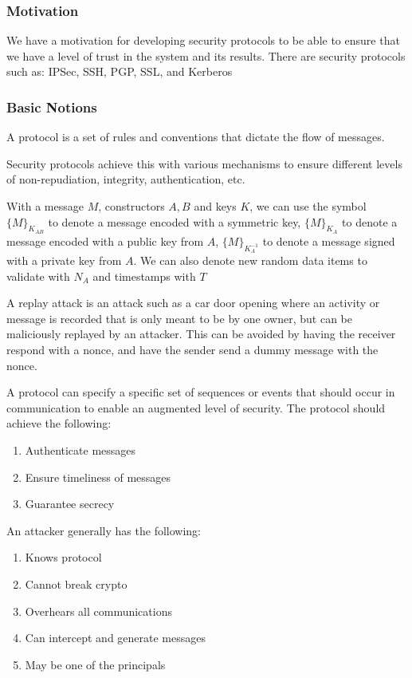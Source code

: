 \documentclass[11pt]{article}
\begin{document}
\subsubsection{Motivation}
We have a motivation for developing security protocols to be able to ensure that we have a level of trust in the system and its results.
There are security protocols such as: IPSec, SSH, PGP, SSL, and Kerberos

\subsubsection{Basic Notions}
A protocol is a set of rules and conventions that dictate the flow of messages.

Security protocols achieve this with various mechanisms to ensure different levels of non-repudiation, integrity, authentication, etc.

With a message $M$, constructors $A,B$ and keys $K$, we can use the symbol $\{ M \}_{K_{AB}}$ to denote a message encoded with a symmetric key,  $\{ M \}_{K_{A}}$ to denote a message encoded with a public key from $A$,  $\{ M \}_{K_{A}^{-1}}$ to denote a message signed with a private key from $A$.
We can also denote new random data items to validate with $N_A$ and timestamps with $T$

A replay attack is an attack such as a car door opening where an activity or message is recorded that is only meant to be by one owner, but can be maliciously replayed by an attacker.
This can be avoided by having the receiver respond with a nonce, and have the sender send a dummy message with the nonce.

A protocol can specify a specific set of sequences or events that should occur in communication to enable an augmented level of security.
The protocol should achieve the following:
\begin{enumerate}
    \item Authenticate messages
    \item Ensure timeliness of messages
    \item Guarantee secrecy
\end{enumerate}

An attacker generally has the following:
\begin{enumerate}
    \item Knows protocol
    \item Cannot break crypto
    \item Overhears all communications
    \item Can intercept and generate messages
    \item May be one of the principals
\end{enumerate}
\end{document}

